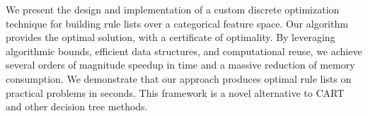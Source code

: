 We present the design and implementation of a custom discrete optimization
technique for building rule lists over a categorical feature space.
%
Our algorithm provides the optimal solution, with a certificate of optimality.
%
By leveraging algorithmic bounds, efficient data structures,
and computational reuse, we achieve several orders of magnitude speedup in time
and a massive reduction of memory consumption.
%
We demonstrate that our approach produces optimal rule lists on practical
problems in seconds.
%
This framework is a novel alternative to CART and other decision tree methods.
